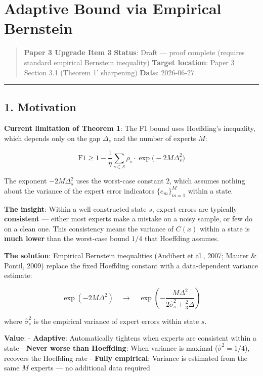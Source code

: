 \documentclass[
  12pt,
]{ctexart}
\author{SCX}
\date{2026}
\begin{document}
\section{Adaptive Bound via Empirical
Bernstein}\label{adaptive-bound-via-empirical-bernstein}

\begin{quote}
\textbf{Paper 3 Upgrade Item 3} \textbf{Status}: Draft --- proof
complete (requires standard empirical Bernstein inequality)
\textbf{Target location}: Paper 3 Section 3.1 (Theorem 1' sharpening)
\textbf{Date}: 2026-06-27
\end{quote}

\begin{center}\rule{0.5\linewidth}{0.5pt}\end{center}

\subsection{1. Motivation}\label{motivation}

\textbf{Current limitation of Theorem 1}: The F1 bound uses Hoeffding's
inequality, which depends only on the gap \(\Delta_s\) and the number of
experts \(M\):

\[\text{F1} \geq 1 - \frac{1}{\eta} \sum_{s \in \mathcal{S}} \rho_s \cdot \exp\!\bigl(-2M\Delta_s^2\bigr)\]

The exponent \(-2M\Delta_s^2\) uses the worst-case constant \(2\), which
assumes nothing about the variance of the expert error indicators
\(\{e_m\}_{m=1}^M\) within a state.

\textbf{The insight}: Within a well-constructed state \(s\), expert
errors are typically \textbf{consistent} --- either most experts make a
mistake on a noisy sample, or few do on a clean one. This consistency
means the variance of \(C(x)\) within a state is \textbf{much lower}
than the worst-case bound \(1/4\) that Hoeffding assumes.

\textbf{The solution}: Empirical Bernstein inequalities (Audibert et
al., 2007; Maurer \& Pontil, 2009) replace the fixed Hoeffding constant
with a data-dependent variance estimate:

\[\exp(-2M\Delta^2) \quad\longrightarrow\quad \exp\!\left(-\frac{M\Delta^2}{2\hat{\sigma}_s^2 + \frac{2}{3}\Delta}\right)\]

where \(\hat{\sigma}_s^2\) is the empirical variance of expert errors
within state \(s\).

\textbf{Value}: - \textbf{Adaptive}: Automatically tightens when experts
are consistent within a state - \textbf{Never worse than Hoeffding}:
When variance is maximal (\(\hat{\sigma}^2 = 1/4\)), recovers the
Hoeffding rate - \textbf{Fully empirical}: Variance is estimated from
the same \(M\) experts --- no additional data required
\end{document}
